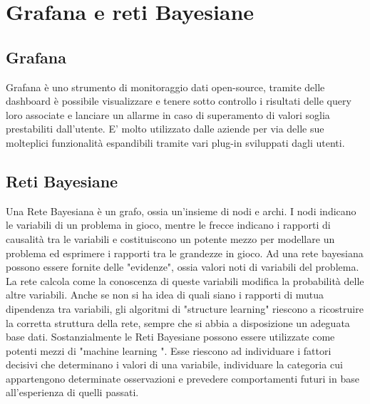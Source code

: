 \section{Grafana e reti Bayesiane}
		\subsection{Grafana}			
Grafana è uno strumento di monitoraggio \pedice dati open-source, tramite delle dashboard è possibile visualizzare e tenere sotto controllo i risultati delle query \pedice loro associate e lanciare un allarme in caso di superamento di valori soglia prestabiliti dall'utente. E' molto utilizzato dalle aziende per via delle sue molteplici funzionalità  espandibili tramite vari plug-in sviluppati dagli utenti.


		\subsection{Reti Bayesiane}
Una Rete Bayesiana è un grafo, ossia un'insieme di nodi e archi. I nodi
indicano le variabili di un problema in gioco, mentre le frecce indicano i
rapporti di causalità tra le variabili e costituiscono un potente mezzo per
modellare un problema ed esprimere i rapporti tra le grandezze in gioco.
Ad una rete bayesiana possono essere fornite delle "evidenze", ossia valori noti di variabili del problema. 
La rete calcola come la conoscenza di queste variabili modifica la probabilità  delle altre variabili.
Anche se non si ha idea di quali siano i rapporti di mutua dipendenza tra
variabili, gli algoritmi di "structure learning" riescono a ricostruire la corretta struttura della rete, sempre che si abbia a disposizione un adeguata base dati.
Sostanzialmente le Reti Bayesiane possono essere utilizzate come potenti mezzi
di "machine learning \pedice". Esse riescono ad individuare i fattori decisivi che
determinano i valori di una variabile, individuare la categoria cui appartengono determinate osservazioni e prevedere comportamenti futuri in base all'esperienza di quelli passati.


\newpage

